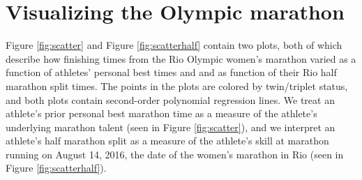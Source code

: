 \documentclass[12pt,titlepage]{article}
\begin{document}
\section*{Visualizing the Olympic marathon}

Figure \ref{fig:scatter} and Figure \ref{fig:scatterhalf} contain two plots, both of which describe
how finishing times from the Rio Olympic women's marathon varied as a
function of athletes' personal best times and and as function of their Rio half marathon
split times.  The points in the plots are colored by twin/triplet
status, and both plots contain second-order polynomial regression
lines.  We treat an athlete's prior personal best marathon time as a
measure of the athlete's underlying marathon talent (seen in Figure \ref{fig:scatter}), and we interpret
an athlete's half marathon split as a measure of the athlete's skill
at marathon running on August 14, 2016, the date of the women's
marathon in Rio (seen in Figure \ref{fig:scatterhalf}).
\end{document}
